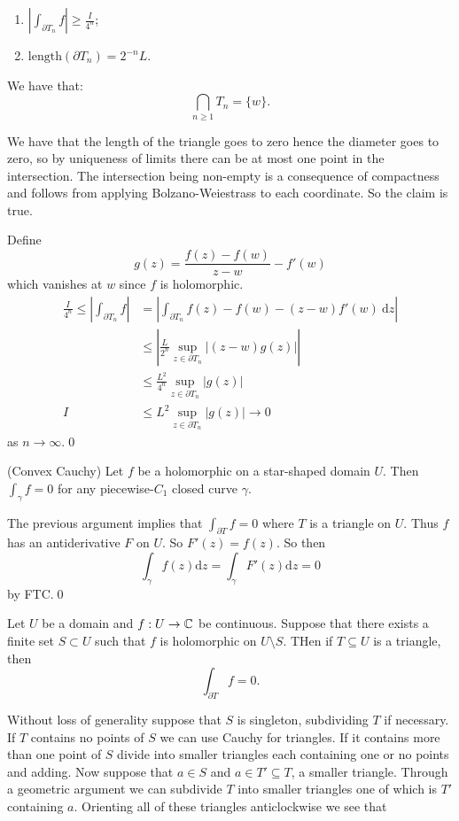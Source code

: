 \documentclass{article}
\begin{document}
\begin{enumerate}
	\item $ \left| \int_{\partial T_n} f\right| \ge \frac I{4^n} $;
	\item $ \mathrm{length}(\partial T_n) = 2^{-n} L $.
\end{enumerate}
\begin{claim}
  We have that:
  \[
	  \bigcap_{n \ge 1} T_n = \{w\}.
  \]
\end{claim}
\pf We have that the length of the triangle goes to zero hence the diameter goes to zero, so by uniqueness of limits there can be at most one point in the intersection. The intersection being non-empty is a consequence of compactness and follows from applying Bolzano-Weiestrass to each coordinate. So the claim is true.\par
Define
\[
g(z) = \frac{f(z)-f(w)}{z-w}-f'(w)
\]
which vanishes at $ w $ since $ f $ is holomorphic.
\begin{align*}
	\frac I{4^n} \le \left|\int_{\partial T_n} f\right| &= \left| \int_{\partial T_n} f(z)-f(w)-(z-w)f'(w)\ \mathrm dz\right|\\
							    &\le\left|\frac L{2^n}\sup_{z\in\partial T_n}|(z-w)g(z)|\right|\\
							    &\le \frac {L^2}{4^n}\sup_{z\in\partial T_n}|g(z)|\\
	I &\le L^2 \sup_{z\in\partial T_n}|g(z)|\to0
\end{align*}
as $ n\to\infty $.\qed
\begin{corollary}
	(Convex Cauchy) Let $ f $ be a holomorphic on a star-shaped domain $ U $. Then $ \int_\gamma f =0 $ for any piecewise-$ C_1 $ closed curve $ \gamma $.
\end{corollary}
\pf The previous argument implies that $ \int_{\partial T} f =0	$ where $ T $ is a triangle on $ U $. Thus $ f $ has an antiderivative $ F $ on $ U $. So $ F'(z) = f(z) $. So then
\[
  \int_\gamma f(z)\mathrm dz = \int_\gamma F'(z)\mathrm dz=0
\]
by FTC.\qed
\begin{proposition}
  Let $ U $ be a domain and $ f:U \to \mathbb{C} $ be continuous. Suppose that there exists a finite set $ S\subset U $ such that $ f $ is holomorphic on $ U\setminus S $. THen if $ T \subseteq U $ is a triangle, then
  \[
	  \int_{\partial T}f = 0.
  \]
\end{proposition}
\pf Without loss of generality suppose that $ S $ is singleton, subdividing $ T $ if necessary. If $ T $ contains no points of $ S $ we can use Cauchy for triangles. If it contains more than one point of $ S $ divide into smaller triangles each containing one or no points and adding. Now suppose that $ a\in S $ and $ a\in T'\subseteq T $, a smaller triangle. Through a geometric argument we can subdivide $ T $ into smaller triangles one of which is $ T' $ containing $ a $. Orienting all of these triangles anticlockwise we see that
\end{document}
